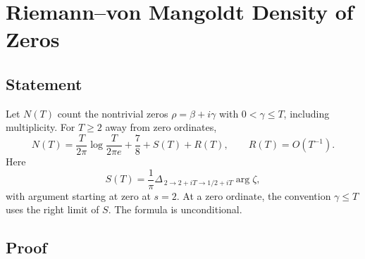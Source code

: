 \section{Riemann--von Mangoldt Density of Zeros}
\label{v4-arith:w5-i:rvm}

\subsection{Statement}
\label{v4-arith:w5-i:rvm-statement}

\begin{theorem}
\label{v4-arith:w5-i:thm:rvm}
Let \(N(T)\) count the nontrivial zeros
\(\rho=\beta+i\gamma\) with \(0<\gamma\le T\), including multiplicity.
For \(T\ge2\) away from zero ordinates,
\begin{equation}
\label{v4-arith:w5-i:eq:rvm}
 N(T)=\frac{T}{2\pi}\log\frac{T}{2\pi e}
                   +\frac78+S(T)+R(T),\qquad R(T)=O(T^{-1}).
\end{equation}
Here
\begin{equation}
\label{v4-arith:w5-i:eq:ST-def}
 S(T)=\frac1\pi\Delta_{\,2\to2+iT\to1/2+iT}\arg\zeta,
\end{equation}
with argument starting at zero at \(s=2\). At a zero ordinate,
the convention \(\gamma\le T\) uses the right limit of \(S\).
The formula is unconditional.
\end{theorem}

\subsection{Proof}
\label{v4-arith:w5-i:rvm-proof}

